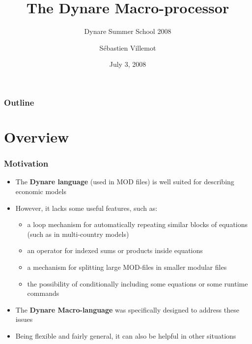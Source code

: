 \documentclass{beamer}
\title{The Dynare Macro-processor}
\subtitle{Dynare Summer School 2008}
\author{Sébastien Villemot}
\institute[BoFrance - PSE]{Bank of France - Paris School of Economics}
\date{July 3, 2008}
\begin{document}
\begin{frame}
  \titlepage
\end{frame}


\begin{frame}
  \frametitle{Outline}
  \tableofcontents
\end{frame}

\section{Overview}

\begin{frame}
  \frametitle{Motivation}
  \begin{itemize}
  \item The \textbf{Dynare language} (used in MOD files) is well suited for describing economic models
  \item However, it lacks some useful features, such as:
    \begin{itemize}
    \item a loop mechanism for automatically repeating similar blocks of equations (such as in multi-country models)
    \item an operator for indexed sums or products inside equations
    \item a mechanism for splitting large MOD-files in smaller modular files
    \item the possibility of conditionally including some equations or some runtime commands
  \end{itemize}
  \item The \textbf{Dynare Macro-language} was specifically designed to address these issues
  \item Being flexible and fairly general, it can also be helpful in other situations
  \end{itemize}
\end{frame}
\end{document}
